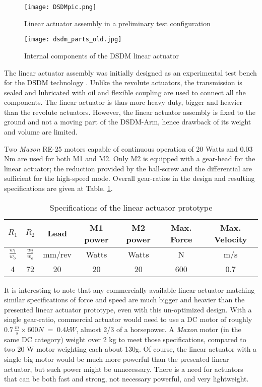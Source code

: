 \begin{figure}[htp]
	\centering
		\texttt{[image: DSDMpic.png]}
	\caption{Linear actuator assembly in a preliminary test configuration} 
	\label{fig:linact}
\end{figure}

\begin{figure}[htbp]
	\centering
		\texttt{[image: dsdm\_parts\_old.jpg]}
	\caption{Internal components of the DSDM linear actuator}
	\label{fig:dsdm_parts_old}
\end{figure}

The linear actuator assembly was initially designed as an experimental test bench for the DSDM technology \cite{girard_two-speed_2015}. Unlike the revolute actuators, the transmission is sealed and lubricated with oil and flexible coupling are used to connect all the components.  The linear actuator is thus more heavy duty, bigger and heavier than the revolute actuators. However, the linear actuator assembly is fixed to the ground and not a moving part of the DSDM-Arm, hence drawback of its weight and volume are limited. 

Two \textit{Maxon} RE-25 motors capable of continuous operation of 20 Watts and 0.03 Nm are used for both M1 and M2. Only M2 is equipped with a gear-head for the linear actuator; the reduction provided by the ball-screw and the differential are sufficient for the high-speed mode. Overall gear-ratios in the design and resulting specifications are given at Table. \ref{tab:speclin}.

\begin{table}[htbp]
	\centering
	\caption{Specifications of the linear actuator prototype}
		\begin{tabular}{ c c c c c c c }
			\hline
			$R_1$ & $R_2$ & Lead & M1 power & M2 power & Max. Force & Max. Velocity \\
			\hline
			$\frac{w_1}{w_o}$ & $\frac{w_2}{w_o}$ & mm/rev &Watts & Watts & N & m/s \\
			\hline \hline
			4 & 72 & 20 & 20 & 20 & 600 & 0.7 \\
			\hline
		\end{tabular}
	\label{tab:speclin}
\end{table}

It is interesting to note that any commercially available linear actuator matching similar specifications of force and speed are much bigger and heavier than the presented linear actuator prototype, even with this un-optimized design. With a single gear-ratio, commercial actuator would need to use a DC motor of roughly $0.7 \, \frac{m}{s} \times 600 N \; = \; 0.4 kW $, almost 2/3 of a horsepower. A \textit{Maxon} motor (in the same DC category) weight over 2 kg to meet those specifications, compared to two 20 W motor weighting each about 130g. Of course, the linear actuator with a single big motor would be much more powerful than the presented linear actuator, but such power might be unnecessary. There is a need for actuators that can be both fast and strong, not necessary powerful, and very lightweight. 


